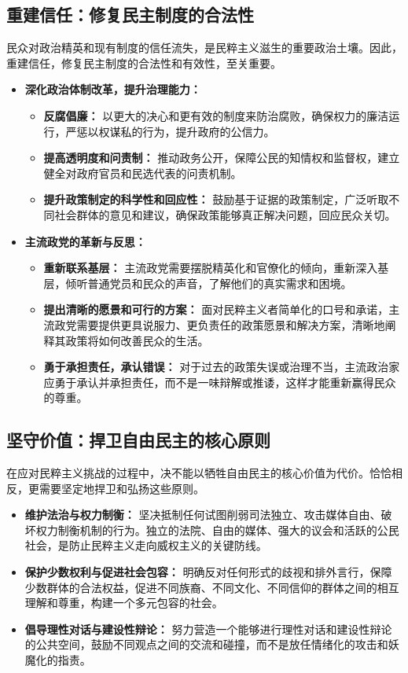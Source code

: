 \documentclass[UTF8, 10pt]{ctexbook}
\begin{document}
\subsection{重建信任：修复民主制度的合法性}
民众对政治精英和现有制度的信任流失，是民粹主义滋生的重要政治土壤。因此，重建信任，修复民主制度的合法性和有效性，至关重要。
\begin{itemize}
    \item \textbf{深化政治体制改革，提升治理能力：}
    \begin{itemize}
        \item \textbf{反腐倡廉：} 以更大的决心和更有效的制度来防治腐败，确保权力的廉洁运行，严惩以权谋私的行为，提升政府的公信力。
        \item \textbf{提高透明度和问责制：} 推动政务公开，保障公民的知情权和监督权，建立健全对政府官员和民选代表的问责机制。
        \item \textbf{提升政策制定的科学性和回应性：} 鼓励基于证据的政策制定，广泛听取不同社会群体的意见和建议，确保政策能够真正解决问题，回应民众关切。
    \end{itemize}
    \item \textbf{主流政党的革新与反思：}
    \begin{itemize}
        \item \textbf{重新联系基层：} 主流政党需要摆脱精英化和官僚化的倾向，重新深入基层，倾听普通党员和民众的声音，了解他们的真实需求和困境。
        \item \textbf{提出清晰的愿景和可行的方案：} 面对民粹主义者简单化的口号和承诺，主流政党需要提供更具说服力、更负责任的政策愿景和解决方案，清晰地阐释其政策将如何改善民众的生活。
        \item \textbf{勇于承担责任，承认错误：} 对于过去的政策失误或治理不当，主流政治家应勇于承认并承担责任，而不是一味辩解或推诿，这样才能重新赢得民众的尊重。
    \end{itemize}
\end{itemize}

\subsection{坚守价值：捍卫自由民主的核心原则}
在应对民粹主义挑战的过程中，决不能以牺牲自由民主的核心价值为代价。恰恰相反，更需要坚定地捍卫和弘扬这些原则。
\begin{itemize}
    \item \textbf{维护法治与权力制衡：} 坚决抵制任何试图削弱司法独立、攻击媒体自由、破坏权力制衡机制的行为。独立的法院、自由的媒体、强大的议会和活跃的公民社会，是防止民粹主义走向威权主义的关键防线。
    \item \textbf{保护少数权利与促进社会包容：} 明确反对任何形式的歧视和排外言行，保障少数群体的合法权益，促进不同族裔、不同文化、不同信仰的群体之间的相互理解和尊重，构建一个多元包容的社会。
    \item \textbf{倡导理性对话与建设性辩论：} 努力营造一个能够进行理性对话和建设性辩论的公共空间，鼓励不同观点之间的交流和碰撞，而不是放任情绪化的攻击和妖魔化的指责。
\end{itemize}
\end{document}
